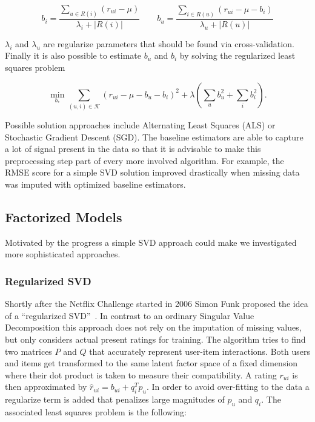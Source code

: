 \documentclass[10pt,conference,compsocconf]{IEEEtran}
\newcommand{\abs}[1]{\left\lvert#1\right\rvert}
\begin{document}
\begin{equation}
  b_i = \frac{\sum_{u \in R(i)} (r_{ui} - \mu)}{\lambda_i + \abs{R(i)}}\qquad
  b_u = \frac{\sum_{i \in R(u)} (r_{ui} - \mu - b_i)}{\lambda_u + \abs{R(u)}}
\end{equation}

$\lambda_i$ and $\lambda_u$ are regularize parameters that should be found via
cross-validation. Finally it is also possible to estimate $b_u$ and $b_i$ by
solving the regularized least squares problem~\cite{koren2008factorization,
  koren2009matrix, koren2010factor, koren2011advances}

\begin{equation}
  \min_{b_*} \sum_{(u,i) \in \mathcal K} {(r_{ui} - \mu - b_u - b_i)}^2 +
  \lambda \left( \sum_u b_u^2 + \sum_i b_i^2 \right ).
\end{equation}

Possible solution approaches include Alternating Least Squares (ALS) or
Stochastic Gradient Descent (SGD). The baseline estimators are able to capture a
lot of signal present in the data so that it is advisable to make this
preprocessing step part of every more involved algorithm. For example, the RMSE
score for a simple SVD solution improved drastically when missing data was
imputed with optimized baseline estimators.

\subsection{Factorized Models}
\label{sub:factorized_models}

Motivated by the progress a simple SVD approach could make we investigated more
sophisticated approaches.

\subsubsection{Regularized SVD}
\label{ssub:regularized_svd}

Shortly after the Netflix Challenge started in 2006 Simon Funk proposed the idea
of a ``regularized SVD''~\cite{funk2006netflix}. In contrast to an ordinary
Singular Value Decomposition this approach does not rely on the imputation of
missing values, but only considers actual present ratings for training. The
algorithm tries to find two matrices $P$ and $Q$ that accurately represent
user-item interactions. Both users and items get transformed to the same latent
factor space of a fixed dimension where their dot product is taken to measure
their compatibility. A rating $r_{ui}$ is then approximated by $\hat{r}_{ui} =
b_{ui} + q_i^{T}p_u$. In order to avoid over-fitting to the data a regularize
term is added that penalizes large magnitudes of $p_u$ and $q_i$. The
associated least squares problem is the following:
\end{document}
